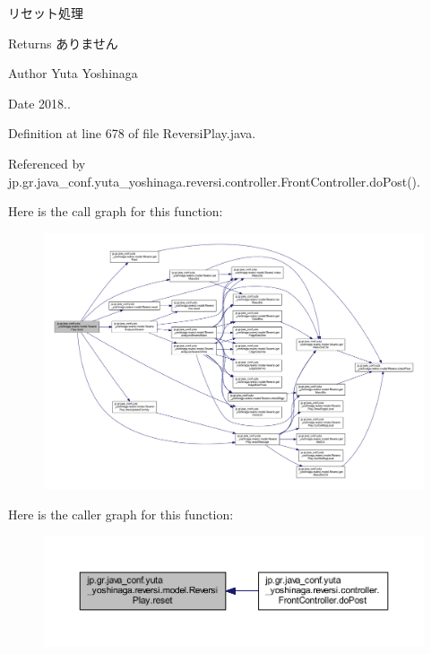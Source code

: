 リセット処理 

\begin{DoxyReturn}{Returns}
ありません 
\end{DoxyReturn}
\begin{DoxyAuthor}{Author}
Yuta Yoshinaga 
\end{DoxyAuthor}
\begin{DoxyDate}{Date}
2018.. 
\end{DoxyDate}


Definition at line 678 of file Reversi\+Play.\+java.



Referenced by jp.\+gr.\+java\+\_\+conf.\+yuta\+\_\+yoshinaga.\+reversi.\+controller.\+Front\+Controller.\+do\+Post().

Here is the call graph for this function\+:
\nopagebreak
\begin{figure}[H]
\begin{center}
\leavevmode
\includegraphics[width=350pt]{classjp_1_1gr_1_1java__conf_1_1yuta__yoshinaga_1_1reversi_1_1model_1_1_reversi_play_a040fddf6e59c00de4c9c2ecdaedcb574_cgraph}
\end{center}
\end{figure}
Here is the caller graph for this function\+:
\nopagebreak
\begin{figure}[H]
\begin{center}
\leavevmode
\includegraphics[width=350pt]{classjp_1_1gr_1_1java__conf_1_1yuta__yoshinaga_1_1reversi_1_1model_1_1_reversi_play_a040fddf6e59c00de4c9c2ecdaedcb574_icgraph}
\end{center}
\end{figure}

